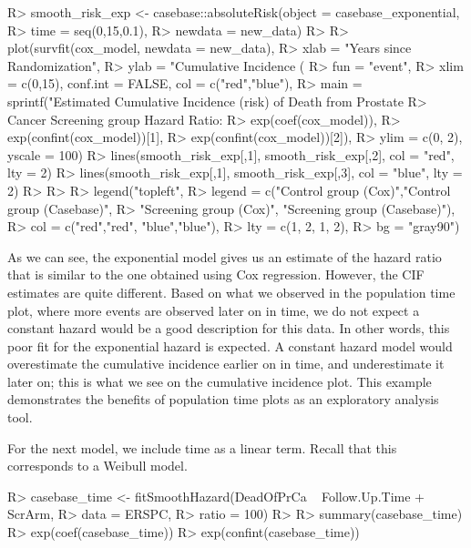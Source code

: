 \documentclass[
]{jss}
\begin{document}
\begin{CodeChunk}

\begin{CodeInput}
R> smooth_risk_exp <- casebase::absoluteRisk(object = casebase_exponential, 
R>                                           time = seq(0,15,0.1), 
R>                                           newdata = new_data)
R> 
R> plot(survfit(cox_model, newdata = new_data),
R>      xlab = "Years since Randomization", 
R>      ylab = "Cumulative Incidence (%
R>      fun = "event",
R>      xlim = c(0,15), conf.int = FALSE, col = c("red","blue"), 
R>      main = sprintf("Estimated Cumulative Incidence (risk) of Death from Prostate 
R>                     Cancer Screening group Hazard Ratio: %
R>                     exp(coef(cox_model)), 
R>                     exp(confint(cox_model))[1], 
R>                     exp(confint(cox_model))[2]),
R>      ylim = c(0, 2), yscale = 100)
R> lines(smooth_risk_exp[,1], smooth_risk_exp[,2], col = "red", lty = 2)
R> lines(smooth_risk_exp[,1], smooth_risk_exp[,3], col = "blue", lty = 2)
R> 
R> 
R> legend("topleft", 
R>        legend = c("Control group (Cox)","Control group (Casebase)",
R>                   "Screening group (Cox)", "Screening group (Casebase)"), 
R>        col = c("red","red", "blue","blue"),
R>        lty = c(1, 2, 1, 2), 
R>        bg = "gray90")
\end{CodeInput}
\end{CodeChunk}

As we can see, the exponential model gives us an estimate of the hazard
ratio that is similar to the one obtained using Cox regression. However,
the CIF estimates are quite different. Based on what we observed in the
population time plot, where more events are observed later on in time,
we do not expect a constant hazard would be a good description for this
data. In other words, this poor fit for the exponential hazard is
expected. A constant hazard model would overestimate the cumulative
incidence earlier on in time, and underestimate it later on; this is
what we see on the cumulative incidence plot. This example demonstrates
the benefits of population time plots as an exploratory analysis tool.

For the next model, we include time as a linear term. Recall that this
corresponds to a Weibull model.

\begin{CodeChunk}

\begin{CodeInput}
R> casebase_time <- fitSmoothHazard(DeadOfPrCa ~ Follow.Up.Time + ScrArm, 
R>                                  data = ERSPC, 
R>                                  ratio = 100)
R> 
R> summary(casebase_time)
R> exp(coef(casebase_time))
R> exp(confint(casebase_time))
\end{CodeInput}
\end{CodeChunk}
\end{document}
